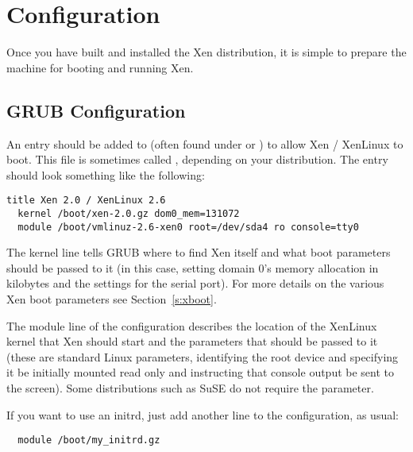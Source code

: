 \section{Configuration}
\label{s:configure}

Once you have built and installed the Xen distribution, it is simple
to prepare the machine for booting and running Xen.

\subsection{GRUB Configuration}

An entry should be added to  (often found under
 or ) to allow Xen / XenLinux to boot.
This file is sometimes called , depending on your
distribution.  The entry should look something like the following:

{\small
\begin{verbatim}
title Xen 2.0 / XenLinux 2.6
  kernel /boot/xen-2.0.gz dom0_mem=131072
  module /boot/vmlinuz-2.6-xen0 root=/dev/sda4 ro console=tty0
\end{verbatim}
}

The kernel line tells GRUB where to find Xen itself and what boot
parameters should be passed to it (in this case, setting domain 0's
memory allocation in kilobytes and the settings for the serial port).
For more details on the various Xen boot parameters see
Section~\ref{s:xboot}.

The module line of the configuration describes the location of the
XenLinux kernel that Xen should start and the parameters that should
be passed to it (these are standard Linux parameters, identifying the
root device and specifying it be initially mounted read only and
instructing that console output be sent to the screen).  Some
distributions such as SuSE do not require the  parameter.



If you want to use an initrd, just add another  line to
the configuration, as usual:

{\small
\begin{verbatim}
  module /boot/my_initrd.gz
\end{verbatim}
}

